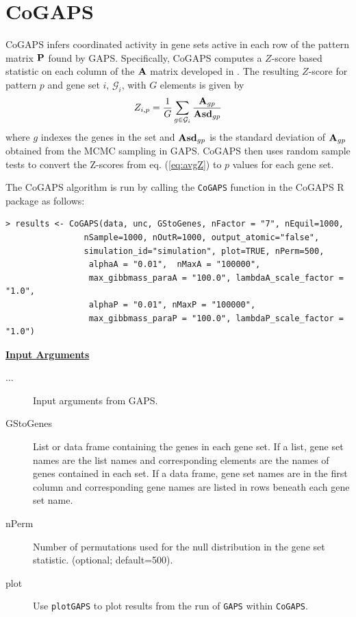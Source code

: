 \documentclass{report}
\begin{document}
\section{CoGAPS} \label{CoGAPSRun}

\par CoGAPS infers coordinated activity in gene sets active in each row of the pattern matrix ${\bf{P}}$ found by GAPS.  Specifically, CoGAPS computes a $Z$-score based statistic on each column of the ${\bf{A}}$ matrix developed in \cite{Ochs2009}.  The resulting $Z$-score for pattern $p$ and gene set $i$, $\mathcal{G}_{i}$, with $G$ elements is given by
\begin{equation}
Z_{i,p} = \frac{1}{G} \sum\limits_{g \in \mathcal{G}_{i}} {\frac{{\bf{A}}_{gp}}{{\bf{Asd}}_{gp}}}
\label{eq:avgZ}
\end{equation}
where $g$ indexes the genes in the set and ${\bf{Asd}}_{gp}$ is the standard deviation of ${\bf{A}}_{gp}$ obtained from the MCMC sampling in GAPS.  CoGAPS then uses random sample tests to convert the Z-scores from eq. (\ref{eq:avgZ}) to $p$ values for each gene set.

\par The CoGAPS algorithm is run by calling the \texttt{CoGAPS} function in the CoGAPS R package as follows:
\begin{verbatim}
> results <- CoGAPS(data, unc, GStoGenes, nFactor = "7", nEquil=1000,
                nSample=1000, nOutR=1000, output_atomic="false",
                simulation_id="simulation", plot=TRUE, nPerm=500,
                 alphaA = "0.01",  nMaxA = "100000", 
                 max_gibbmass_paraA = "100.0", lambdaA_scale_factor = "1.0", 
                 alphaP = "0.01", nMaxP = "100000", 
                 max_gibbmass_paraP = "100.0", lambdaP_scale_factor = "1.0") 

\end{verbatim}

\par \noindent \textbf{\underline{Input Arguments}}
\begin{description}
\item[$\ldots$]{Input arguments from GAPS.}
\item[GStoGenes]{List or data frame containing the genes in each gene set. If a list, gene set names are the list names and corresponding elements are the names of genes contained in each set. If a data frame, gene set names are in the first column and corresponding gene names are listed in rows beneath each gene set name.}
\item[nPerm]{Number of permutations used for the null distribution in the gene set statistic. (optional; default=500).}
\item[plot]{Use \texttt{plotGAPS} to plot results from the run of \texttt{GAPS} within \texttt{CoGAPS}.}
\end{description}
  
\end{document}
